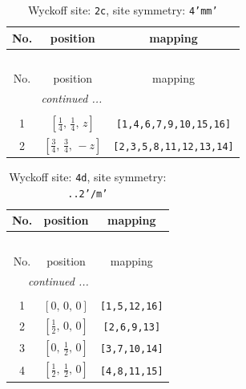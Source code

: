 \documentclass[fleqn,8pt]{jsarticle}
\begin{document}
\renewcommand{\arraystretch}{1.2}
\begin{longtable}{ccc}
\caption{Wyckoff site: {\tt 2c}, site symmetry: {\tt 4'mm'}}
 \\
 \hline \hline
No. & position & mapping \\ \hline \endfirsthead

\multicolumn{2}{l}{\tablename\ \thetable{}} \\
 \hline \hline
No. & position & mapping \\ \hline \endhead

 \hline \hline
\multicolumn{2}{r}{\footnotesize\it continued ...} \\ \endfoot

 \hline \hline
\multicolumn{2}{r}{} \\ \endlastfoot

1 & $\left[ \frac{1}{4},\, \frac{1}{4},\, z \right]$ & {\tt [1,4,6,7,9,10,15,16]} \\ \hline
2 & $\left[ \frac{3}{4},\, \frac{3}{4},\, - z \right]$ & {\tt [2,3,5,8,11,12,13,14]} \\
\end{longtable}
\renewcommand{\arraystretch}{1.2}
\begin{longtable}{ccc}
\caption{Wyckoff site: {\tt 4d}, site symmetry: {\tt ..2'/m'}}
 \\
 \hline \hline
No. & position & mapping \\ \hline \endfirsthead

\multicolumn{2}{l}{\tablename\ \thetable{}} \\
 \hline \hline
No. & position & mapping \\ \hline \endhead

 \hline \hline
\multicolumn{2}{r}{\footnotesize\it continued ...} \\ \endfoot

 \hline \hline
\multicolumn{2}{r}{} \\ \endlastfoot

1 & $\left[ 0,\, 0,\, 0 \right]$ & {\tt [1,5,12,16]} \\ \hline
2 & $\left[ \frac{1}{2},\, 0,\, 0 \right]$ & {\tt [2,6,9,13]} \\ \hline
3 & $\left[ 0,\, \frac{1}{2},\, 0 \right]$ & {\tt [3,7,10,14]} \\ \hline
4 & $\left[ \frac{1}{2},\, \frac{1}{2},\, 0 \right]$ & {\tt [4,8,11,15]} \\
\end{longtable}
\renewcommand{\arraystretch}{1.2}
\end{document}
